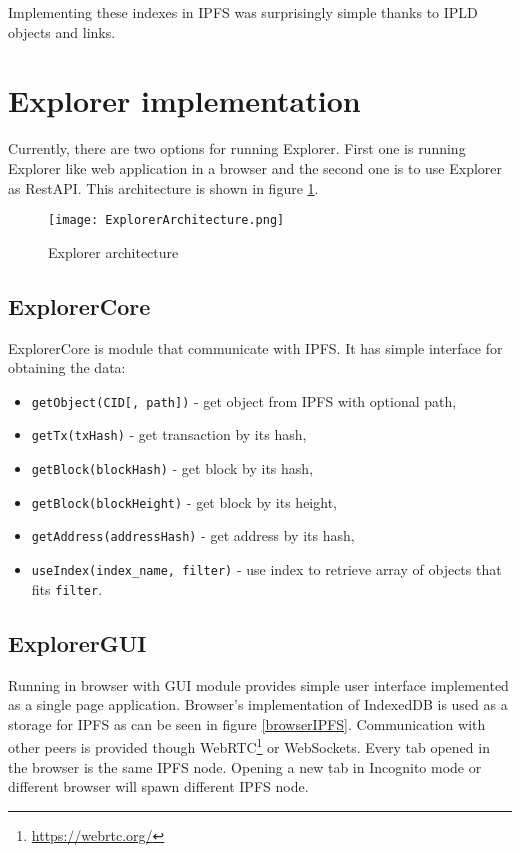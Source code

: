 Implementing these indexes in IPFS was surprisingly simple thanks to IPLD objects and links.


\section{Explorer implementation}
Currently, there are two options for running Explorer. First one is running Explorer like web application in a browser and the second one is to use Explorer as RestAPI. This architecture is shown in figure \ref{ExplorerArchitecture}.

\begin{figure}[h]
    \centering
    \texttt{[image: ExplorerArchitecture.png]}
    \caption{Explorer architecture}
    \label{ExplorerArchitecture}
\end{figure}

\subsection{ExplorerCore}
ExplorerCore is module that communicate with IPFS. It has simple interface for obtaining the data:
\begin{itemize}
    \item \texttt{getObject(CID[, path])} - get object from IPFS with optional path,
    \item \texttt{getTx(txHash)} - get transaction by its hash,
    \item \texttt{getBlock(blockHash)} - get block by its hash,
    \item \texttt{getBlock(blockHeight)} - get block by its height,
    \item \texttt{getAddress(addressHash)} - get address by its hash,
    \item \texttt{useIndex(index\_name, filter)} - use index to retrieve array of objects that fits \texttt{filter}.
\end{itemize}

\subsection{ExplorerGUI}
Running in browser with GUI module provides simple user interface implemented as a single page application. Browser's implementation of IndexedDB is used as a storage for IPFS as can be seen in figure \ref{browserIPFS}. Communication with other peers is provided though WebRTC\footnote{\url{https://webrtc.org/}} or WebSockets. Every tab opened in the browser is the same IPFS node. Opening a new tab in Incognito mode or different browser will spawn different IPFS node.

